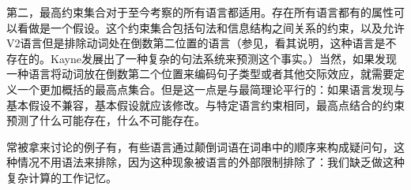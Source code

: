 第二，最高约束集合对于至今考察的所有语言都适用。存在所有语言都有的属性可以看做是一个假设。这个约束集合包括句法和信息结构之间关系的约束，以及允许V2语言但是排除动词处在倒数第二位置的语言（参见\citet[]{Kayne94a-u}，看其说明，这种语言是不存在的。Kayne发展出了一种复杂的句法系统来预测这个事实。）当然，如果发现一种语言将动词放在倒数第二个位置来编码句子类型或者其他交际效应，就需要定义一个更加概括的最高点集合。但是这一点是与最简理论平行的：如果语言发现与基本假设不兼容，基本假设就应该修改。与特定语言约束相同，最高点结合的约束预测了什么可能存在，什么不可能存在。

常被拿来讨论的例子有，有些语言通过颠倒词语在词串中的顺序来构成疑问句\citep{MMGRRBW2003a}，这种情况不用语法来排除，因为这种现象被语言的外部限制排除了：我们缺乏做这种复杂计算的工作记忆。

